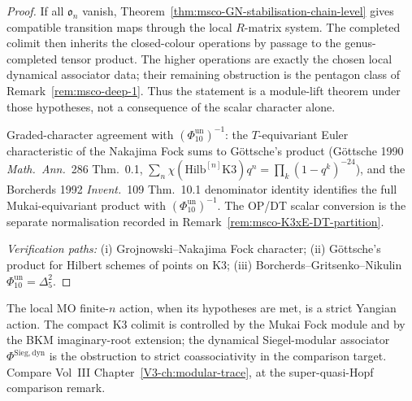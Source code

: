 \begin{proof}
If all $\mathfrak{o}_n$ vanish, Theorem~\ref{thm:msco-GN-stabilisation-chain-level}
gives compatible transition maps through the local $R$-matrix system.
The completed colimit then inherits the closed-colour operations by
passage to the genus-completed tensor product. The higher operations
are exactly the chosen local dynamical associator data; their remaining
obstruction is the pentagon class of
Remark~\ref{rem:msco-deep-1}. Thus the statement is a module-lift
theorem under those hypotheses, not a consequence of the scalar
character alone.

Graded-character agreement with $(\Phi_{10}^{\mathrm{un}})^{-1}$: the $T$-equivariant Euler
characteristic of the Nakajima Fock sums to G\"ottsche's product
(G\"ottsche 1990 \emph{Math.\ Ann.}~286 Thm.~0.1,
$\sum_n\chi(\mathrm{Hilb}^{[n]}\mathrm K3)q^n = \prod_k(1-q^k)^{-24}$),
and the Borcherds 1992 \emph{Invent.}~109 Thm.~10.1 denominator identity
identifies the full Mukai-equivariant product with
$(\Phi_{10}^{\mathrm{un}})^{-1}$. The OP/DT scalar conversion is the
separate normalisation recorded in
Remark~\ref{rem:msco-K3xE-DT-partition}.

\emph{Verification paths:}
(i) Grojnowski--Nakajima Fock character;
(ii) G\"ottsche's product for Hilbert schemes of points on K3;
(iii) Borcherds--Gritsenko--Nikulin
$\Phi_{10}^{\mathrm{un}}=\Delta_5^2$.
\end{proof}

\begin{remark}
\label{rem:msco-BKM-vs-MO-range}
The local MO finite-$n$ action, when its hypotheses are met, is a
strict Yangian action. The compact K3 colimit is controlled by the
Mukai Fock module and by the BKM imaginary-root extension; the dynamical
Siegel-modular associator $\Phi^{\mathrm{Sieg,dyn}}$ is the obstruction
to strict coassociativity in the comparison target. Compare
Vol~III Chapter~\ref{V3-ch:modular-trace}, at the
super-quasi-Hopf comparison remark.
\end{remark}
